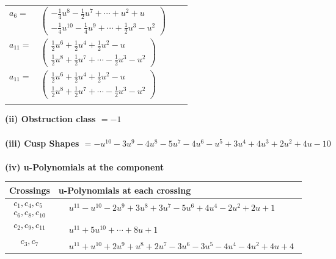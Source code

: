 \documentclass[1p]{elsarticle_modified}
\theoremstyle{definition}
\begin{document}
\begin{tabular}{m{7pt} m{180pt} m{7pt} m{180pt} }
\flushright $a_{6}=$&$\begin{pmatrix}-\frac{1}{4} u^8-\frac{1}{2} u^7+\cdots+u^2+u\\-\frac{1}{4} u^{10}-\frac{1}{4} u^9+\cdots+\frac{1}{2} u^3- u^2\end{pmatrix}$ \\
\flushright $a_{11}=$&$\begin{pmatrix}\frac{1}{2} u^6+\frac{1}{2} u^4+\frac{1}{2} u^2- u\\\frac{1}{2} u^8+\frac{1}{2} u^7+\cdots-\frac{1}{2} u^3- u^2\end{pmatrix}$\\ \flushright $a_{11}=$&$\begin{pmatrix}\frac{1}{2} u^6+\frac{1}{2} u^4+\frac{1}{2} u^2- u\\\frac{1}{2} u^8+\frac{1}{2} u^7+\cdots-\frac{1}{2} u^3- u^2\end{pmatrix}$\\&\end{tabular}
\flushleft \textbf{(ii) Obstruction class $= -1$}\\~\\
\flushleft \textbf{(iii) Cusp Shapes $= - u^{10}-3 u^9-4 u^8-5 u^7-4 u^6- u^5+3 u^4+4 u^3+2 u^2+4 u-10$}\\~\\
\newpage\renewcommand{\arraystretch}{1}
\flushleft \textbf{(iv) u-Polynomials at the component}\newline \\
\begin{tabular}{m{50pt}|m{274pt}}
Crossings & \hspace{64pt}u-Polynomials at each crossing \\
\hline $$\begin{aligned}c_{1},c_{4},c_{5}\\c_{6},c_{8},c_{10}\end{aligned}$$&$\begin{aligned}
&u^{11}- u^{10}-2 u^9+3 u^8+3 u^7-5 u^6+4 u^4-2 u^2+2 u+1
\end{aligned}$\\
\hline $$\begin{aligned}c_{2},c_{9},c_{11}\end{aligned}$$&$\begin{aligned}
&u^{11}+5 u^{10}+\cdots+8 u+1
\end{aligned}$\\
\hline $$\begin{aligned}c_{3},c_{7}\end{aligned}$$&$\begin{aligned}
&u^{11}+u^{10}+2 u^9+u^8+2 u^7-3 u^6-3 u^5-4 u^4-4 u^2+4 u+4
\end{aligned}$\\
\hline
\end{tabular}\\~\\
\end{document}
